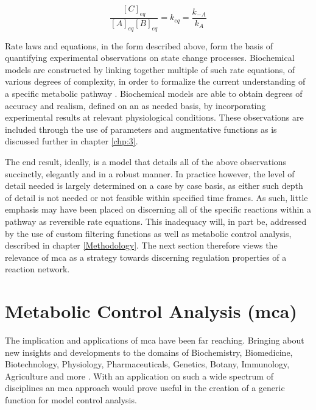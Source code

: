 \begin{equation}
\frac{[C]_{eq}}{[A]_{eq}[B]_{eq}} = k_{eq} = \frac{k_{-A}}{k_A}
\end{equation}

Rate laws and equations, in the form described above, form the basis of quantifying experimental observations on state change processes. Biochemical models are constructed by linking together multiple of such rate equations, of various degrees of complexity, in order to formalize the current understanding of a specific metabolic pathway \cite{Copeland2000, Hynne2001, Kell2006}. Biochemical models are able to obtain degrees of accuracy and realism, defined on an as needed basis, by incorporating experimental results at relevant physiological conditions. These observations are included through the use of parameters and augmentative functions as is discussed further in chapter \ref{chp:3}. 

The end result, ideally, is a model that details all of the above observations succinctly, elegantly and in a robust manner. In practice however, the level of detail needed is largely determined on a case by case basis, as either such depth of detail is not needed or not feasible within specified time frames. As such, little emphasis may have been placed on discerning all of the specific reactions within a pathway as reversible rate equations. This inadequacy  will, in part be, addressed by the use of custom filtering functions as well as metabolic control analysis, described in chapter \ref{Methodology}. The next section therefore views the relevance of \gls{mca} as a strategy towards discerning regulation properties of a reaction network.


\section{Metabolic Control Analysis (\gls{mca})}
The implication and applications of \gls{mca} have been far reaching. Bringing about new insights and developments to the domains of Biochemistry, Biomedicine, Biotechnology, Physiology, Pharmaceuticals, Genetics, Botany, Immunology, Agriculture and more \citep{Kacser1981, Sorribas1995, Holms1996, Cornish1999, Boren2002, Cascante2002, Olivier2004, Weselake2008}. With an application on such a wide spectrum of disciplines an \gls{mca} approach would prove useful in the creation of a generic function for model control analysis.

